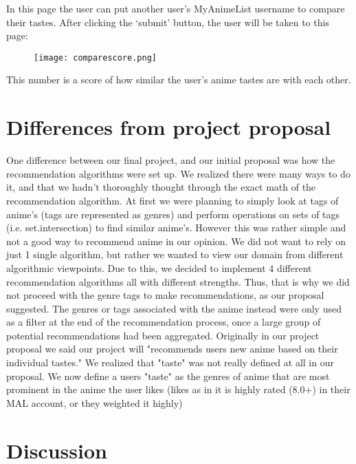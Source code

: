 \documentclass[fontsize=11pt]{article}
\begin{document}
\newpage

\item[] In this page the user can put another user's MyAnimeList username to compare their tastes. After clicking the `submit' button, the user will be taken to this page:

\begin{figure}[htp]
    \centering
    \texttt{[image: comparescore.png]}
\end{figure}

\item[] This number is a score of how similar the user's anime tastes are with each other. 


\section*{Differences from project proposal}

One difference between our final project, and our initial proposal was how the recommendation algorithms were set up. We realized there were many ways to do it, and that we hadn't thoroughly thought through the exact math of the recommendation algorithm. At first we were planning to simply look at tags of anime's (tags are represented as genres) and perform operations on sets of tags (i.e. set.intersection) to find similar anime's. However this was rather simple and not a good way to recommend anime in our opinion. We did not want to rely on just 1 single algorithm, but rather we wanted to view our domain from different algorithmic viewpoints. Due to this, we decided to implement 4 different recommendation algorithms all with different strengths. Thus, that is why we did not proceed with the genre tags to make recommendations, as our proposal suggested. The genres or tags associated with the anime instead were only used as a filter at the end of the recommendation process, once a large group of potential recommendations had been aggregated. Originally in our project proposal we said our project will "recommends users new anime based on their individual tastes." We realized that "taste" was not really defined at all in our proposal. We now define a users "taste" as the genres of anime that are most prominent in the anime the user likes (likes as in it is highly rated (8.0+) in their MAL account, or they weighted it highly)

\section*{Discussion}
\end{document}

